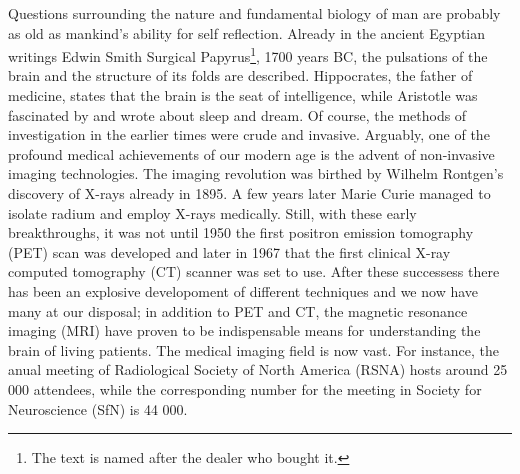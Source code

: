 %
%

\preface



Questions surrounding the nature and fundamental biology of man are probably as old as 
mankind's ability for self reflection. Already in the ancient Egyptian writings
Edwin Smith Surgical Papyrus\footnote{The text is named after the dealer who bought it.}, 
1700 years BC, the pulsations
of the brain and the structure of its folds are described. Hippocrates, the father of medicine, states that
the brain is the seat of intelligence, while Aristotle was fascinated by and wrote about sleep and dream. 
Of course, the methods of investigation in the earlier times were crude and invasive.
Arguably, one of the profound medical achievements of our modern age is the advent of 
non-invasive imaging technologies.  The imaging revolution was birthed by 
Wilhelm Rontgen's discovery of X-rays already in 1895. A few years later  Marie Curie
managed to isolate radium and employ X-rays medically. 
Still, with these early breakthroughs, it was not until 
1950 the first positron emission tomography (PET) scan was developed and
later in 1967 that the first clinical
X-ray computed tomography (CT) scanner was set to use. After these successess there
has been an explosive developoment of different techniques and we now have
many at our disposal; in addition to PET and CT, 
the magnetic resonance imaging (MRI) have proven to be indispensable 
means for understanding the brain of living patients.  
The medical imaging field is now vast. For instance, 
the anual meeting of Radiological Society of North America (RSNA)  
hosts around 25 000 attendees, while  the corresponding number for the meeting in 
Society for Neuroscience (SfN) is 44 000. 

